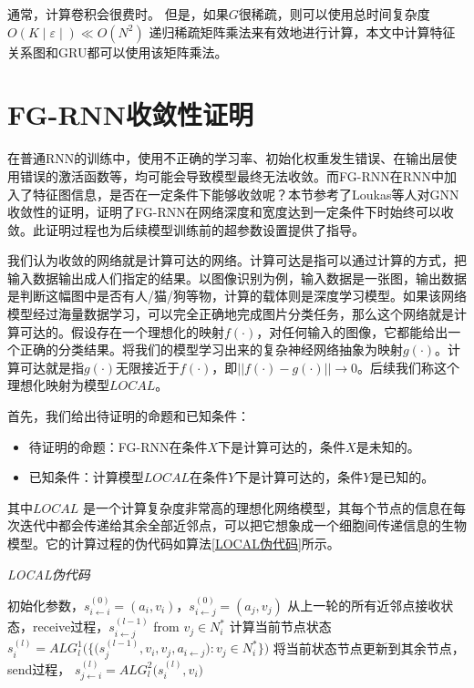 通常，计算卷积会很费时。 但是，如果$G$很稀疏，则可以使用总时间复杂度 $O(K \mid \varepsilon \mid) \ll O(N^ 2)$ 递归稀疏矩阵乘法来有效地进行计算，本文中计算特征关系图和GRU都可以使用该矩阵乘法。


\section{FG-RNN收敛性证明}
在普通RNN的训练中，使用不正确的学习率、初始化权重发生错误、在输出层使用错误的激活函数等，均可能会导致模型最终无法收敛。而FG-RNN在RNN中加入了特征图信息，是否在一定条件下能够收敛呢？本节参考了Loukas等人对GNN收敛性的证明\cite{loukas2019graph}，证明了FG-RNN在网络深度和宽度达到一定条件下时始终可以收敛。此证明过程也为后续模型训练前的超参数设置提供了指导。


我们认为收敛的网络就是计算可达的网络。计算可达是指可以通过计算的方式，把输入数据输出成人们指定的结果。以图像识别为例，输入数据是一张图，输出数据是判断这幅图中是否有人/猫/狗等物，计算的载体则是深度学习模型。如果该网络模型经过海量数据学习，可以完全正确地完成图片分类任务，那么这个网络就是计算可达的。假设存在一个理想化的映射$f(\cdot)$，对任何输入的图像，它都能给出一个正确的分类结果。将我们的模型学习出来的复杂神经网络抽象为映射$g(\cdot)$。计算可达就是指$g(\cdot)$无限接近于$f(\cdot)$，即$||f(\cdot) - g(\cdot)|| \rightarrow 0$。后续我们称这个理想化映射为模型$LOCAL$。

首先，我们给出待证明的命题和已知条件：
\begin{itemize}
  \item 待证明的命题：FG-RNN在条件$X$下是计算可达的，条件$X$是未知的。
  \item 已知条件：计算模型$LOCAL$在条件$Y$下是计算可达的，条件$Y$是已知的。
\end{itemize}


其中$LOCAL$ 是一个计算复杂度非常高的理想化网络模型，其每个节点的信息在每次迭代中都会传递给其余全部近邻点，可以把它想象成一个细胞间传递信息的生物模型。它的计算过程的伪代码如算法\ref{LOCAL伪代码}所示。
\begin{algorithm}[!h]
  \caption{\emph{LOCAL伪代码}}
  \label{LOCAL伪代码}
  \begin{algorithmic}[1]

    \State 初始化参数，$s_{i\leftarrow i}^{(0)}=(a_i, v_i)$，$s_{i\leftarrow j}^{(0)}=(a_j, v_j)$
        \State 从上一轮的所有近邻点接收状态，receive过程，$s_{i\leftarrow j}^{(l-1)}$ from $v_j \in N_i^*$
        \State 计算当前节点状态 $s_i^{(l)} = {ALG}_l^1 \big(\big\{\big(s_j^{(l-1)}, v_i, v_j,  a_{i\leftarrow j}\big): v_j \in N_i^* \big\}\big)$
        \State 将当前状态节点更新到其余节点，send过程， $s_{j\leftarrow i}^{(l)} = {ALG}_l^2 \big(s_i^{(l)}, v_i \big)$
    \EndFor
  \end{algorithmic}
\end{algorithm}

